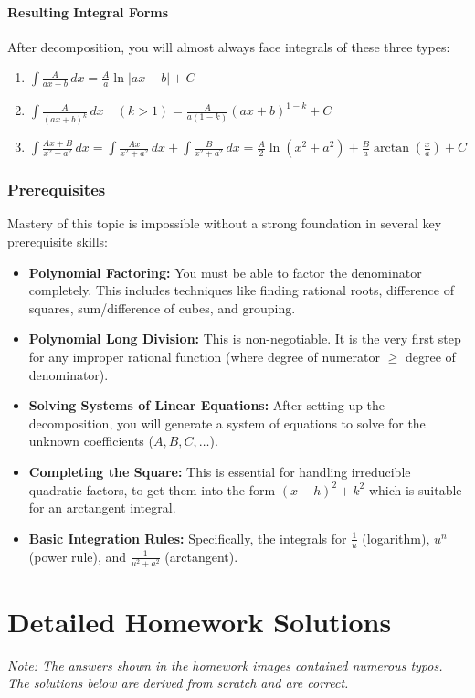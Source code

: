 \documentclass{article}
\begin{document}
\subsection{Resulting Integral Forms}
After decomposition, you will almost always face integrals of these three types:
\begin{enumerate}
    \item $\displaystyle \int \frac{A}{ax+b} \,dx = \frac{A}{a} \ln|ax+b| + C$
    \item $\displaystyle \int \frac{A}{(ax+b)^k} \,dx \quad (k>1) = \frac{A}{a(1-k)}(ax+b)^{1-k} + C$
    \item $\displaystyle \int \frac{Ax+B}{x^2+a^2} \,dx = \int \frac{Ax}{x^2+a^2} \,dx + \int \frac{B}{x^2+a^2} \,dx = \frac{A}{2}\ln(x^2+a^2) + \frac{B}{a}\arctan\left(\frac{x}{a}\right) + C$
\end{enumerate}

\section{Prerequisites}
Mastery of this topic is impossible without a strong foundation in several key prerequisite skills:
\begin{itemize}
    \item \textbf{Polynomial Factoring:} You must be able to factor the denominator completely. This includes techniques like finding rational roots, difference of squares, sum/difference of cubes, and grouping.
    \item \textbf{Polynomial Long Division:} This is non-negotiable. It is the very first step for any improper rational function (where degree of numerator $\ge$ degree of denominator).
    \item \textbf{Solving Systems of Linear Equations:} After setting up the decomposition, you will generate a system of equations to solve for the unknown coefficients ($A, B, C, \dots$).
    \item \textbf{Completing the Square:} This is essential for handling irreducible quadratic factors, to get them into the form $(x-h)^2+k^2$ which is suitable for an arctangent integral.
    \item \textbf{Basic Integration Rules:} Specifically, the integrals for $\frac{1}{u}$ (logarithm), $u^n$ (power rule), and $\frac{1}{u^2+a^2}$ (arctangent).
\end{itemize}

\part{Detailed Homework Solutions}
\textit{Note: The answers shown in the homework images contained numerous typos. The solutions below are derived from scratch and are correct.}
\end{document}
